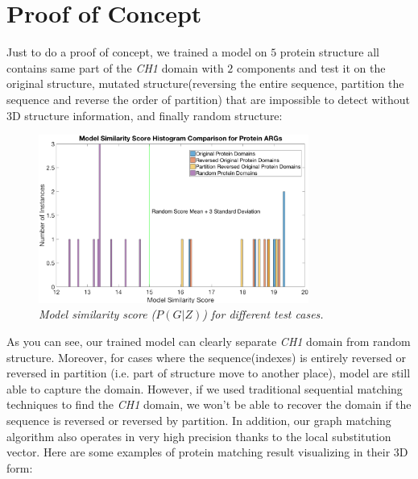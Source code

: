 \section{Proof of Concept}
\label{sec:poc}

Just to do a proof of concept\footnotemark, we trained a model on $5$ protein structure all contains same part of the \emph{CH1} domain with $2$ components and test it on the original structure, mutated structure(reversing the entire sequence, partition the sequence and reverse the order of partition) that are impossible to detect without 3D structure information, and finally random structure:

\begin{figure}[h]
	\centering
	\captionsetup{justification=centering}
	\includegraphics[width=0.79\textwidth]{figs/protein_learning.png}
	\caption[Caption for LOF]{\emph{Model similarity score ($P(G|Z)$) for different test cases.}}
	\label{fig:protein_learning}
\end{figure}

As you can see, our trained model can clearly separate \emph{CH1} domain from random structure. Moreover, for cases where the sequence(indexes) is entirely reversed or reversed in partition (i.e. part of structure move to another place), model are still able to capture the domain. However, if we used traditional sequential matching techniques to find the \emph{CH1} domain, we won't be able to recover the domain if the sequence is reversed or reversed by partition. In addition, our graph matching algorithm also operates in very high precision thanks to the local substitution vector. Here are some examples of protein matching result visualizing in their 3D form:\\

